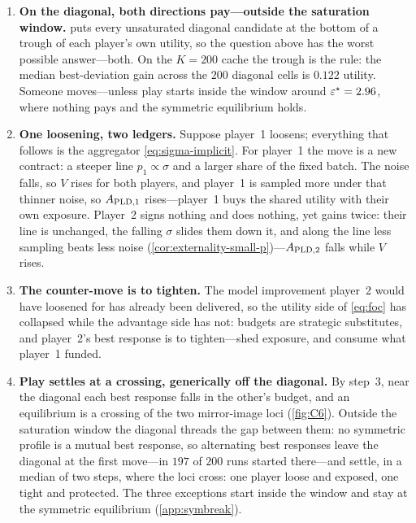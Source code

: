 \begin{enumerate}
\item \textbf{On the diagonal, both directions pay---outside the
saturation window.}  puts every
unsaturated diagonal candidate at the bottom of a trough of each
player's own utility, so the question above has the worst possible
answer---both. On the $K = 200$ cache the trough is the rule: the
median best-deviation gain across the $200$ diagonal cells is
$0.122$ utility. Someone moves---unless play starts inside the
window around $\varepsilon^\star = 2.96$, where nothing pays and the
symmetric equilibrium holds.

\item \textbf{One loosening, two ledgers.} Suppose player~1
loosens; everything that follows is the aggregator
\eqref{eq:sigma-implicit}. For player~1 the move is a new
contract: a steeper line $p_1 \propto \sigma$ and a larger share
of the fixed batch. The noise falls, so $V$ rises for both
players, and player~1 is sampled more under that thinner noise,
so $A_{\mathrm{PLD},1}$ rises---player~1 buys the shared utility with their
own exposure. Player~2 signs nothing and does nothing, yet gains
twice: their line is unchanged, the falling $\sigma$ slides them
down it, and along the line less sampling beats less noise
(\cref{cor:externality-small-p})---$A_{\mathrm{PLD},2}$ falls while $V$
rises.

\item \textbf{The counter-move is to tighten.} The model
improvement player~2 would have loosened for has already been
delivered, so the utility side of \eqref{eq:foc} has collapsed
while the advantage side has not: budgets are strategic
substitutes, and player~2's best response is to tighten---shed
exposure, and consume what player~1 funded.

\item \textbf{Play settles at a crossing, generically off the
diagonal.} By step~3, near the diagonal each best response falls
in the other's budget, and an equilibrium is a crossing of the two
mirror-image loci (\cref{fig:C6}). Outside the saturation window
the diagonal threads the gap between them: no symmetric profile is
a mutual best response, so alternating best responses leave the
diagonal at the first move---in $197$ of $200$ runs started
there---and settle, in a median of two steps, where the loci
cross: one player loose and exposed, one tight and protected. The
three exceptions start inside the window and stay at the symmetric
equilibrium (\cref{app:symbreak}).
\end{enumerate}

